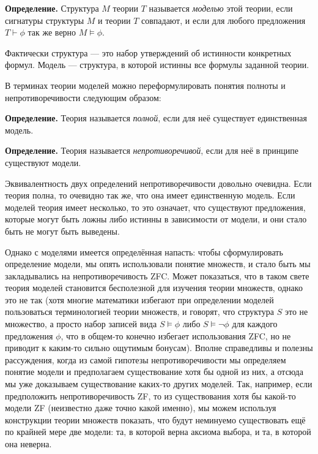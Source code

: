 {\bfseries Определение.} Структура $M$ теории $T$ называется {\slshape моделью} этой теории, если сигнатуры структуры $M$ и теории $T$ совпадают, и если для любого предложения $T\vdash\phi$ так же верно $M\models\phi$.

Фактически структура — это набор утверждений об истинности конкретных формул. Модель — структура, в которой истинны все формулы заданной теории.

В терминах теории моделей можно переформулировать понятия полноты и непротиворечивости следующим образом:

{\bfseries Определение.} Теория называется {\slshape полной}, если для неё существует единственная модель.

{\bfseries Определение.} Теория называется {\slshape непротиворечивой}, если для неё в принципе существуют модели.

Эквивалентность двух определений непротиворечивости довольно очевидна. Если теория полна, то очевидно так же, что она имеет единственную модель. Если моделей теория имеет несколько, то это означает, что существуют предложения, которые могут быть ложны либо истинны в зависимости от модели, и они стало быть не могут быть выведены.

Однако с моделями имеется определённая напасть: чтобы сформулировать определение модели, мы опять использовали понятие множеств, и стало быть мы закладывались на непротиворечивость ZFC. Может показаться, что в таком свете теория моделей становится бесполезной для изучения теории множеств, однако это не так (хотя многие математики избегают при определении моделей пользоваться терминологией теории множеств, и говорят, что структура $S$ это не множество, а просто набор записей вида $S\models\phi$ либо $S\models \neg\phi$ для каждого предложения $\phi$, что в общем-то конечно избегает использования ZFC, но не приводит к каким-то сильно ощутимым бонусам). Вполне справедливы и полезны рассуждения, когда из самой гипотезы непротиворечивости мы определяем понятие модели и предполагаем существование хотя бы одной из них, а отсюда мы уже доказываем существование каких-то других моделей. Так, например, если предположить непротиворечивость ZF, то из существования хотя бы какой-то модели ZF (неизвестно даже точно какой именно), мы можем используя конструкции теории множеств показать, что будут неминуемо существовать ещё по крайней мере две модели: та, в которой верна аксиома выбора, и та, в которой она неверна.

